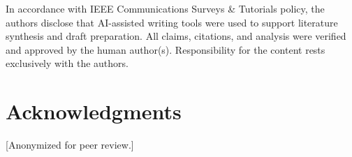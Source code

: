 \documentclass[journal]{IEEEtran}
\begin{document}
In accordance with IEEE Communications Surveys \& Tutorials policy, the authors
disclose that AI-assisted writing tools were used to support literature synthesis
and draft preparation. All claims, citations, and analysis were verified and
approved by the human author(s). Responsibility for the content rests
exclusively with the authors.

\section*{Acknowledgments}

[Anonymized for peer review.]



\end{document}
